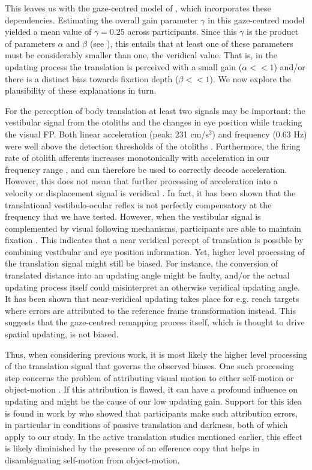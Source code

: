 This leaves us with the gaze-centred model of , which incorporates these dependencies. Estimating the overall gain parameter $\gamma$ in this gaze-centred model yielded a mean value of $\gamma = 0.25$ across participants. Since this $\gamma$ is the product of parameters $\alpha$ and $\beta$ (see ), this entails that at least one of these parameters must be considerably smaller than one, the veridical value. That is, in the updating process the translation is perceived with a small gain ($\alpha << 1$) and/or there is a distinct bias towards fixation depth ($\beta << 1$). We now explore the plausibility of these explanations in turn.

For the perception of body translation at least two signals may be important: the vestibular signal from the otoliths and the changes in eye position while tracking the visual FP. Both linear acceleration (peak: 231 cm/s$^2$) and frequency (0.63 Hz) were well above the detection thresholds of the otoliths \cite{benson1986, yu2012}. Furthermore, the firing rate of otolith afferents increases monotonically with acceleration in our frequency range \cite{fernandez1976, yu2012}, and can therefore be used to correctly decode acceleration. However, this does not mean that further processing of acceleration into a velocity or displacement signal is veridical \cite{merfeld2005}. In fact, it has been shown that the translational vestibulo-ocular reflex is not perfectly compensatory at the frequency that we have tested. However, when the vestibular signal is complemented by visual following mechanisms, participants are able to maintain fixation \cite{medendorp2002, paige1998}. This indicates that a near veridical percept of translation is possible by combining vestibular and eye position information. Yet, higher level processing of the translation signal might still be biased. For instance, the conversion of translated distance into an updating angle might be faulty, and/or the actual updating process itself could misinterpret an otherwise veridical updating angle. It has been shown that near-veridical updating takes place for e.g. reach targets \cite{henriques1998, vanpelt2007} where errors are attributed to the reference frame transformation instead. This suggests that the gaze-centred remapping process itself, which is thought to drive spatial updating, is not biased.

Thus, when considering previous work, it is most likely the higher level processing of the translation signal that governs the observed biases. One such processing step concerns the problem of attributing visual motion to either self-motion or object-motion \cite{vonhelmholtz1867}. If this attribution is flawed, it can have a profound influence on updating and might be the cause of our low updating gain. Support for this idea is found in work by  who showed that participants make such attribution errors, in particular in conditions of passive translation and darkness, both of which apply to our study. In the active translation studies mentioned earlier, this effect is likely diminished by the presence of an efference copy that helps in disambiguating self-motion from object-motion.

